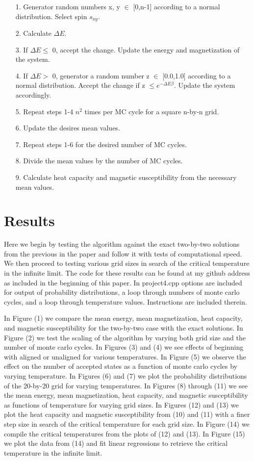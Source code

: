 \documentclass[11pt,a4paper]{article}
\begin{document}
\begin{enumerate}
\item[1.]
Generator random numbers x, y $\in$ [0,n-1] according to a normal distribution. Select spin $s_{xy}$.
\item[2.]
Calculate $\Delta E$.
\item[3.]
If $\Delta E \leq$ 0, accept the change. Update the energy and magnetization of the system.
\item[4.]
If $\Delta E >$ 0, generator a random number z $\in$ [0.0,1.0] according to a normal distribution. Accept the change if z $\leq e^{-\Delta E\beta}$. Update the system accordingly.
\item[5.]
Repeat steps 1-4 $n^2$ times per MC cycle for a square n-by-n grid.
\item[6.]
Update the desires mean values.
\item[7.]
Repeat steps 1-6 for the desired number of MC cycles.
\item[8.]
Divide the mean values by the number of MC cycles.
\item[9.]
Calculate heat capacity and magnetic susceptibility from the necessary mean values.
\end{enumerate}

\section{Results}

Here we begin by testing the algorithm against the exact two-by-two solutions from the previous in the paper and follow it with tests of computational speed. We then proceed to testing various grid sizes in search of the critical temperature in the infinite limit. The code for these results can be found at my github address as included in the beginning of this paper. In project4.cpp options are included for output of probability distributions, a loop through numbers of monte carlo cycles, and a loop through temperature values. Instructions are included therein.

In Figure (1) we compare the mean energy, mean magnetization, heat capacity, and magnetic susceptibility for the two-by-two case with the exact solutions. In Figure (2) we test the scaling of the algorithm by varying both grid size and the number of monte carlo cycles. In Figures (3) and (4) we see effects of beginning with aligned or unaligned for various temperatures. In Figure (5) we observe the effect on the number of accepted states as a function of monte carlo cycles by varying temperature. In Figures (6) and (7) we plot the probability distributions of the 20-by-20 grid for varying temperatures. In Figures (8) through (11) we see the mean energy, mean magnetization, heat capacity, and magnetic susceptibility as functions of temperature for varying grid sizes. In Figures (12) and (13) we plot the heat capacity and magnetic susceptibility from (10) and (11) with a finer step size in search of the critical temperature for each grid size. In Figure (14) we compile the critical temperatures from the plots of (12) and (13). In Figure (15) we plot the data from (14) and fit linear regressions to retrieve the critical temperature in the infinite limit.
 
\end{document}
